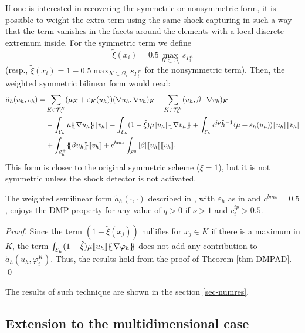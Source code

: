 If one is interested in recovering the symmetric or nonsymmetric form, it is possible to weight the extra term using the same shock capturing in such a way that the term vanishes in the facets around the elements with a local discrete extremum inside. For the symmetric term we define $$\tilde{\xi}(x_i) = 0.5 \max_{K\subset\Omega_i} s_{\Gamma_i^K}$$  (resp., $\tilde{\xi}(x_i) = 1-0.5 \max_{K\subset\Omega_i} s_{\Gamma_i^K}$ for the nonsymmetric term). Then, the weighted symmetric bilinear form would read:
\begin{align}\label{eq-tildebform}
\tilde{a}_h(u_h,v_h) = & \displaystyle\sum\limits_{K\in \thn} (\mu_K + \varepsilon_K(u_h)) ( \nabla u_h, \nabla v_{h})_K - 
\displaystyle\sum\limits_{K\in \thn} ( u_h,  \beta \cdot \nabla v_{h})_K \\\nonumber
 & - \int_{\mathcal{E}_h} \mu \mean{\nabla u_h} \jump{v_h} - \int_{\mathcal{E}_h} (1-\tilde{\xi} )\mu \jump{u_h} \mean{\nabla v_h}    +  \int_{ \mathcal{E}_h} c^{ip} \tilde{h}^{-1} \meanhar{\mu+\varepsilon_h(u_h)}\jump{  u_{h}}\jump{  v_{h}}  \\\nonumber
 &+ \int_{\mathcal{E}_h^+}   \mean{\beta u_h}\jump{v_h} + c^{bms} \int_{ \mathcal{E}^0}  |\beta|  \jump{u_h} \jump{v_h}.
\end{align}
{ This form is closer to the original symmetric scheme ($\xi=1$), but it is not symmetric unless the shock detector is not activated.}
\begin{corollary}\label{cor-xiweight}
The weighted semilinear form $\tilde{a}_h(\cdot,\cdot)$ described in , with $\varepsilon_h$ as in  and $c^{bms} = 0.5$, enjoys the DMP property for any value of $q>0$ if $\nu>1$ and $c_i^{ip}>0.5$.
\end{corollary}
\begin{proof}
Since the term $(1-\tilde{\xi}(x_j) )$ nullifies for $x_j\in K$ if there is a maximum in $K$, the term {${\int_{\mathcal{E}_h} (1-\tilde{\xi})\mu \lbrack\!\lbrack u_h \rbrack\!\rbrack \{\! \!\{ \nabla \varphi_h\}\! \!\} }$} does not add any contribution to $\tilde{a}_h(u_h,\varphi_i^K)$. Thus, the results hold from the proof of Theorem \ref{thm-DMPAD}. \qed
\end{proof}
 The results of such technique are shown in the section \ref{sec-numres}.

\subsection{Extension to the multidimensional case}\label{sec-multid}

